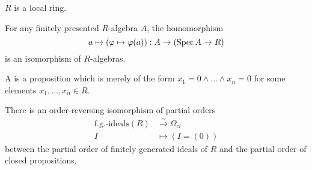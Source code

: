 \documentclass{zariski}
\begin{document}
\begin{axiom}[Loc]
  \label{loc}
  $R$ is a local ring.
\end{axiom}

\begin{axiom}[SQC]
  \label{sqc}
  For any finitely presented $R$-algebra $A$, the homomorphism
  \[ a \mapsto (\varphi\mapsto \varphi(a)) : A \to (\operatorname{Spec} A \to R)\]
  is an isomorphism of $R$-algebras.
\end{axiom}


\begin{definition}
  A  is a proposition
  which is merely of the form $x_1 = 0 \land \dots \land x_n = 0$
  for some elements $x_1, \dots, x_n \in R$.
\end{definition}

\begin{proposition}
  There is an order-reversing isomorphism of partial orders
  \begin{align*}
    \text{f.g.-ideals}(R) &\xrightarrow{{\sim}} \Omega_{cl} \\
    I &\mapsto (I = (0))
  \end{align*}
  between the partial order of finitely generated ideals of $R$
  and the partial order of closed propositions.
\end{proposition}
\end{document}
